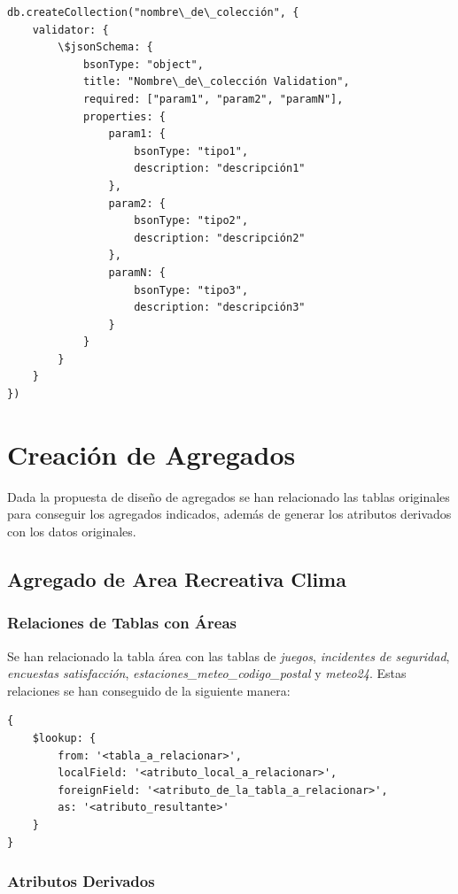 \documentclass[]{article}
\begin{document}
\lstset{style=python}
\begin{lstlisting}
db.createCollection("nombre\_de\_colección", {
    validator: {
        \$jsonSchema: {
            bsonType: "object",
            title: "Nombre\_de\_colección Validation",
            required: ["param1", "param2", "paramN"],
            properties: {
                param1: {
                    bsonType: "tipo1",
                    description: "descripción1"
                },
                param2: {
                    bsonType: "tipo2",
                    description: "descripción2"
                },
                paramN: {
                    bsonType: "tipo3",
                    description: "descripción3"
                }
            }
        }
    }
})
\end{lstlisting}

\section{Creación de Agregados}
\label{sec:creacion_agregados}
Dada la propuesta de diseño de agregados se han relacionado las tablas originales para conseguir los agregados indicados, además de generar los atributos derivados con los datos originales.

\subsection{Agregado de Area Recreativa Clima}
\label{subsec:agregado_area}

\subsubsection{Relaciones de Tablas con Áreas}
\label{subsubsec:relaciones_area}

Se han relacionado la tabla área con las tablas de \textit{juegos}, \textit{incidentes de seguridad}, \textit{encuestas satisfacción}, \textit{estaciones_meteo_codigo_postal} y \textit{meteo24}.
Estas relaciones se han conseguido de la siguiente manera:
\begin{lstlisting}
{
    $lookup: {
        from: '<tabla_a_relacionar>',
        localField: '<atributo_local_a_relacionar>',
        foreignField: '<atributo_de_la_tabla_a_relacionar>',
        as: '<atributo_resultante>'
    }
}
\end{lstlisting}


\subsubsection{Atributos Derivados}
\label{subsubsec:derivados_area}
\end{document}
